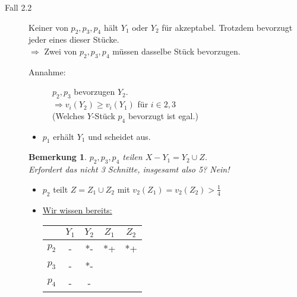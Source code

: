 \documentclass[a4paper,10pt]{scrartcl}
\newtheorem*{bemerkung*}{Bemerkung}
\begin{document}
\begin{description}
\begin{itemize}
\begin{description}
                        \item[Fall 2.2] Keiner von $p_2,p_3,p_4$ hält $Y_1$ oder $Y_2$ für akzeptabel. Trotzdem bevorzugt jeder eines dieser
                                        Stücke.\\$\Rightarrow$ Zwei von $p_2,p_3,p_4$ müssen dasselbe Stück bevorzugen.
                                        \begin{description}
                                         \item[Annahme:] $p_2,p_3$ bevorzugen $Y_2$.\\$\Rightarrow v_i(Y_2)\geq v_i(Y_1)$ für $i\in{2,3}$\\
                                                         (Welches $Y$-Stück $p_4$ bevorzugt ist egal.) 
                                        \end{description}
                                        \begin{itemize}
                                         \item $p_1$ erhält $Y_1$ und scheidet aus.
                                        \end{itemize}
                                        \begin{bemerkung*}
                                         $p_2,p_3,p_4$ teilen $X-Y_1=Y_2\cup Z$.\\Erfordert das nicht 3 Schnitte, insgesamt also 5? Nein!
                                        \end{bemerkung*}
                                        \begin{itemize}
                                         \item $p_2$ teilt $Z=Z_1\cup Z_2$ mit $v_2(Z_1)=v_2(Z_2)>\frac{1}{4}$
                                         \item \underline{Wir wissen bereits:}\\
                                               \begin{tabular}{c|cccc}
                                                 &$Y_1$&$Y_2$&$Z_1$&$Z_2$\\ \hline
                                                 $p_2$ & - &*-&*+&*+\\
                                                 $p_3$ & -&*-&&\\
                                                 $p_4$ &-&-&&
                                               \end{tabular}

\end{itemize}
\end{description}
\end{itemize}
\end{description}
\end{document}
